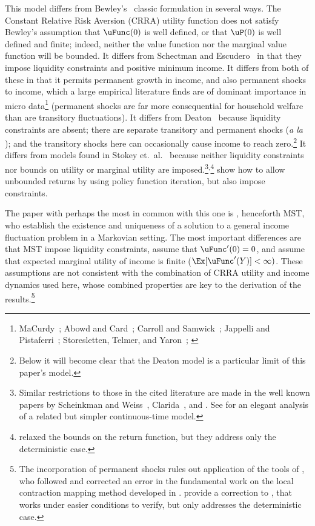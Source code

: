 \documentclass[BufferStockTheory]{subfiles}
\begin{document}
\hypertarget{DiffFromLit}{} This model differs from Bewley's~\citeyearpar{bewleyPIH} classic formulation in several ways. The Constant Relative Risk Aversion (CRRA) utility function does not satisfy Bewley's assumption that $\uFunc(0)$ is well defined, or that $\uP(0)$ is well defined and finite; indeed, neither the value function nor the marginal value function will be bounded.  It differs from Schectman and Escudero~\citeyearpar{seIncFluct} in that they impose liquidity constraints and positive minimum income.  It differs from both of these in that it permits permanent growth in income, and also permanent shocks to income, which a large empirical literature finds are of dominant importance in micro data\footnote{MaCurdy~\citeyearpar{macurdyTimeseries}; Abowd and Card~\citeyearpar{acCovariance}; Carroll and Samwick~\citeyearpar{csNature}; Jappelli and Pistaferri~\citeyearpar{jpCins}; Storesletten, Telmer, and Yaron~\citeyearpar{styConsumption}; \cite{blpRisk}} (permanent shocks are far more consequential for household welfare than are transitory fluctuations).  It differs from Deaton~\citeyearpar{deatonLiqConstr} because liquidity constraints are absent; there are separate transitory and permanent shocks (\textit{a la} \cite{muthOptimal}); and the transitory shocks here can occasionally cause income to reach zero.\footnote{Below it will become clear that the Deaton model is a particular limit of this paper's model.}  It differs from models found in Stokey et.\ al.~\citeyearpar{slpMethods} because neither liquidity constraints nor bounds on utility or marginal utility are imposed.\footnote{Similar restrictions to those in the cited literature are made in the well known papers by Scheinkman and Weiss~\citeyearpar{scheinkman&weiss:borrowing}, Clarida~\citeyearpar{claridaErgodic}, and \cite{cwcUnderUncert}.  See \cite{tocheUrisk} for an elegant analysis of a related but simpler continuous-time model.}$^{,}$\footnote{\cite{asHomogeneous} relaxed the bounds on the return function, but they address only the deterministic case.} \cite{lsIncFluct} show how to allow unbounded returns by using policy function iteration, but also impose constraints.

The paper with perhaps the most in common with this one is \cite{mstIncFluct}, henceforth MST, who establish the existence and uniqueness of a solution to a general income fluctuation problem in a Markovian setting.  The most important differences are that MST impose liquidity constraints, assume that $\uFunc^{\prime}(0)=0$, and  assume that expected marginal utility of income is finite ($\Ex[\uFunc^{\prime}(Y)]<\infty)$.  These assumptions are not consistent with the combination of CRRA utility and income dynamics used here, whose combined properties are key to the derivation of the results.\footnote{The incorporation of permanent shocks rules out application of the tools of \cite{mnUnique}, who followed and corrected an error in the fundamental work on the local contraction mapping method developed in \cite{rrExistence}.  \cite{mvExistence} provide a correction to \cite{rrExistence}, that works under easier conditions to verify, but only addresses the deterministic case.}
\end{document}
